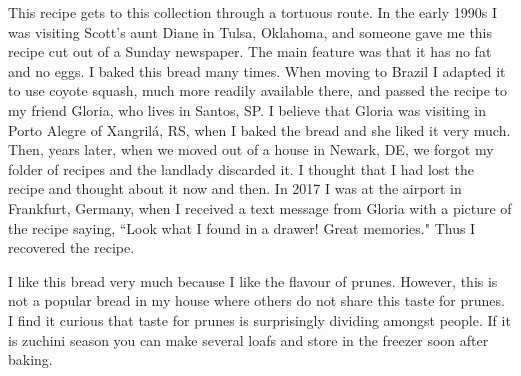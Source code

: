 \documentclass[11pt,letterpaper]{article}
\begin{document}


This recipe gets to this collection through a tortuous route. In the early 1990s I was visiting Scott's aunt Diane in Tulsa, Oklahoma, and someone gave me this recipe cut out of a Sunday newspaper. The main feature was that it has no fat and no eggs. I baked this bread many times. When moving to Brazil I adapted it to use coyote squash, much more readily available there, and passed the recipe to my friend Gloria, who lives in Santos, SP. I believe that Gloria was visiting in Porto Alegre of Xangril\'a, RS, when I baked the bread and she liked it very much. Then, years later, when we moved out of a house in Newark, DE, we forgot my folder of recipes and the landlady discarded it. I thought that I had lost the recipe and thought about it now and then. In 2017 I was at the airport in Frankfurt, Germany, when I received a text message from Gloria with a picture of the recipe saying, ``Look what I found in a drawer! Great memories." Thus I recovered the recipe. 

I like this bread very much because I like the flavour of prunes. However, this is not a popular bread in my house where others do not share this taste for prunes. I find it curious that taste for prunes is surprisingly dividing amongst people. If it is zuchini season you can make several loafs and store in the freezer soon after baking.
\end{document}
